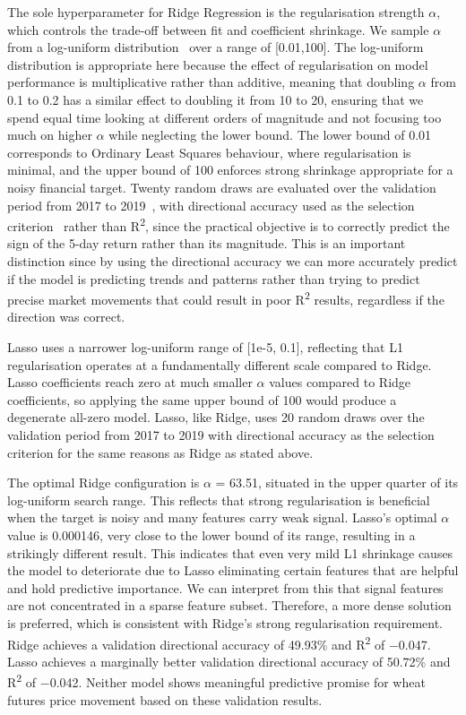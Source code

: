 \documentclass[pdflatex,sn-mathphys-num, oneside]{sn-jnl}%
\theoremstyle{thmstyleone}%
\theoremstyle{thmstyletwo}%
\theoremstyle{thmstylethree}%
\begin{document}
The sole hyperparameter for Ridge Regression is the regularisation strength $\alpha$, which controls the trade-off between fit and coefficient shrinkage. We sample $\alpha$ from a log-uniform distribution~\cite{bib26} over a range of [0.01,100]. The log-uniform distribution is appropriate here because the effect of regularisation on model performance is multiplicative rather than additive, meaning that doubling $\alpha$ from 0.1 to 0.2 has a similar effect to doubling it from 10 to 20, ensuring that we spend equal time looking at different orders of magnitude and not focusing too much on higher $\alpha$ while neglecting the lower bound. The lower bound of 0.01 corresponds to Ordinary Least Squares behaviour, where regularisation is minimal, and the upper bound of 100 enforces strong shrinkage appropriate for a noisy financial target. Twenty random draws are evaluated over the validation period from 2017 to 2019~\cite{bib26}, with directional accuracy used as the selection criterion~\cite{bib31} rather than R\textsuperscript{2}, since the practical objective is to correctly predict the sign of the 5-day return rather than its magnitude. This is an important distinction since by using the directional accuracy we can more accurately predict if the model is predicting trends and patterns rather than trying to predict precise market movements that could result in poor R\textsuperscript{2} results, regardless if the direction was correct.

 Lasso uses a narrower log-uniform range of [1e-5, 0.1], reflecting that L1 regularisation operates at a fundamentally different scale compared to Ridge. Lasso coefficients reach zero at much smaller $\alpha$ values compared to Ridge coefficients, so applying the same upper bound of 100 would produce a degenerate all-zero model. Lasso, like Ridge, uses 20 random draws over the validation period from 2017 to 2019 with directional accuracy as the selection criterion for the same reasons as Ridge as stated above. 

The optimal Ridge configuration is $\alpha$ = 63.51, situated in the upper quarter of its log-uniform search range. This reflects that strong regularisation is beneficial when the target is noisy and many features carry weak signal. Lasso's optimal $\alpha$ value is 0.000146, very close to the lower bound of its range, resulting in a strikingly different result. This indicates that even very mild L1 shrinkage causes the model to deteriorate due to Lasso eliminating certain features that are helpful and hold predictive importance. We can interpret from this that signal features are not concentrated in a sparse feature subset. Therefore, a more dense solution is preferred, which is consistent with Ridge's strong regularisation requirement. Ridge achieves a validation directional accuracy of 49.93\% and R\textsuperscript{2} of −0.047. Lasso achieves a marginally better validation directional accuracy of 50.72\% and R\textsuperscript{2} of −0.042. Neither model shows meaningful predictive promise for wheat futures price movement based on these validation results.
\end{document}
